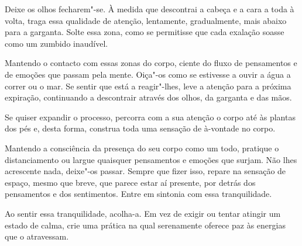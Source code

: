 Deixe os olhos fecharem"-se. À medida que descontrai a cabeça e a cara a toda à
volta, traga essa qualidade de atenção, lentamente, gradualmente, mais abaixo
para a garganta. Solte essa zona, como se permitisse que cada exalação soasse
como um zumbido inaudível.

Mantendo o contacto com essas zonas do corpo, ciente do fluxo de pensamentos e
de emoções que passam pela mente. Oiça"-os como se estivesse a ouvir a água a
correr ou o mar. Se sentir que está a reagir"-lhes, leve a atenção para a
próxima expiração, continuando a descontrair através dos olhos, da garganta e
das mãos.

Se quiser expandir o processo, percorra com a sua atenção o corpo até às plantas
dos pés e, desta forma, construa toda uma sensação de à-vontade no corpo.

Mantendo a consciência da presença do seu corpo como um todo, pratique o
distanciamento ou largue quaisquer pensamentos e emoções que surjam. Não lhes
acrescente nada, deixe"-os passar. Sempre que fizer isso, repare na sensação de
espaço, mesmo que breve, que parece estar aí presente, por detrás dos
pensamentos e dos sentimentos. Entre em sintonia com essa tranquilidade.

Ao sentir essa tranquilidade, acolha-a. Em vez de exigir ou tentar atingir um
estado de calma, crie uma prática na qual serenamente oferece paz às energias
que o atravessam.
